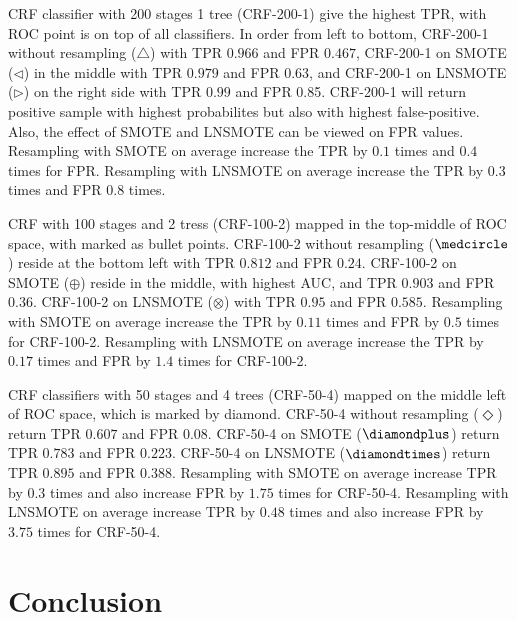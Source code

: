 \documentclass[conference,compsoc,a4paper,twocolumn,final]{IEEEtran}
\begin{document}
CRF classifier with 200 stages 1 tree (CRF-200-1) give the highest TPR, with
ROC point is on top of all classifiers.
In order from left to bottom, CRF-200-1 without resampling ($\triangle$) with
TPR $0.966$ and FPR $0.467$, CRF-200-1 on SMOTE ($\triangleleft$) in the middle
with TPR $0.979$ and FPR $0.63$, and CRF-200-1 on LNSMOTE ($\triangleright$) on
the right side with TPR $0.99$ and FPR 0.85.
CRF-200-1 will return positive sample with highest probabilites but also with
highest false-positive.
Also, the effect of SMOTE and LNSMOTE can be viewed on FPR values.
Resampling with SMOTE on average increase the TPR by $0.1$ times and $0.4$
times for FPR.
Resampling with LNSMOTE on average increase the TPR by $0.3$ times and FPR
$0.8$ times.

CRF with 100 stages and 2 tress (CRF-100-2) mapped in the top-middle of ROC
space, with marked as bullet points.
CRF-100-2 without resampling ($\medcircle$) reside at the bottom left with TPR
$0.812$ and FPR $0.24$.
CRF-100-2 on SMOTE ($\oplus$) reside in the middle, with highest AUC, and TPR
$0.903$ and FPR $0.36$.
CRF-100-2 on LNSMOTE ($\otimes$) with TPR $0.95$ and FPR $0.585$.
Resampling with SMOTE on average increase the TPR by $0.11$ times and FPR by
$0.5$ times for CRF-100-2.
Resampling with LNSMOTE on average increase the TPR by $0.17$ times and FPR by
$1.4$ times for CRF-100-2.

CRF classifiers with 50 stages and 4 trees (CRF-50-4) mapped on the middle left
of ROC space, which is marked by diamond.
CRF-50-4 without resampling ($\Diamond$) return TPR $0.607$ and FPR $0.08$.
CRF-50-4 on SMOTE ($\diamondplus$) return TPR $0.783$ and FPR $0.223$.
CRF-50-4 on LNSMOTE ($\diamondtimes$) return TPR $0.895$ and FPR $0.388$.
Resampling with SMOTE on average increase TPR by $0.3$ times and also increase
FPR by $1.75$ times for CRF-50-4.
Resampling with LNSMOTE on average increase TPR by $0.48$ times and also
increase FPR by $3.75$ times for CRF-50-4.


\section{Conclusion}
\label{section:conclusion}
\end{document}
